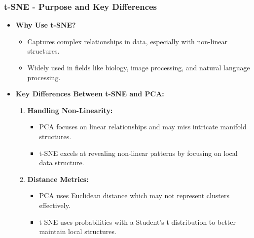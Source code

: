 \documentclass{beamer}
\begin{document}
\begin{frame}[fragile]
    \frametitle{t-SNE - Purpose and Key Differences}
    \begin{itemize}
        \item \textbf{Why Use t-SNE?}
        \begin{itemize}
            \item Captures complex relationships in data, especially with non-linear structures.
            \item Widely used in fields like biology, image processing, and natural language processing.
        \end{itemize}
        
        \item \textbf{Key Differences Between t-SNE and PCA:}
        \begin{enumerate}
            \item \textbf{Handling Non-Linearity:}
            \begin{itemize}
                \item PCA focuses on linear relationships and may miss intricate manifold structures.
                \item t-SNE excels at revealing non-linear patterns by focusing on local data structure.
            \end{itemize}
            \item \textbf{Distance Metrics:}
            \begin{itemize}
                \item PCA uses Euclidean distance which may not represent clusters effectively.
                \item t-SNE uses probabilities with a Student's t-distribution to better maintain local structures.
            \end{itemize}
        \end{enumerate}
    \end{itemize}
\end{frame}
\end{document}
